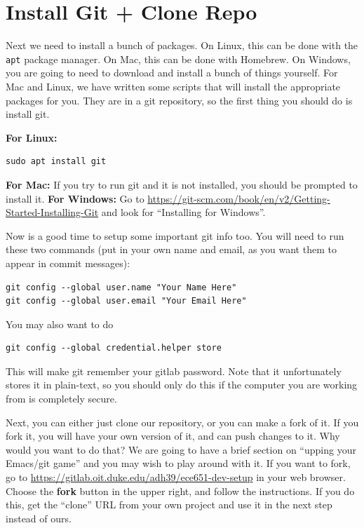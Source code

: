\documentclass[12pt]{article}
\begin{document}
\section{Install Git + Clone Repo}
\label{setup:git}
Next we need to install a bunch of packages.  On Linux, this can be done with
the \verb+apt+ package manager.  On Mac, this can be done with Homebrew.
On Windows, you are going to need to download and install a bunch of things yourself.
For Mac and Linux, we have written some scripts that will install the appropriate
packages for you.  They are in a git repository, so the first thing you should
do is install git.

\textbf{For Linux:}
\begin{verbatim}
sudo apt install git
\end{verbatim}
\textbf{For Mac:}
If you try to run git and it is not installed, you should be prompted to install it.
\textbf{For Windows:}
Go to \url{https://git-scm.com/book/en/v2/Getting-Started-Installing-Git} and look for ``Installing for Windows''.


Now is a good time to setup some important git info too.  You will
need to run these two commands (put in your own name and email, as you
want them to appear in commit messages):

\begin{verbatim}
git config --global user.name "Your Name Here" 
git config --global user.email "Your Email Here"
\end{verbatim}

You may also want to do

\begin{verbatim}
git config --global credential.helper store
\end{verbatim}

This will make git remember your gitlab password.  Note that it
unfortunately stores it in plain-text, so you should only do this if
the computer you are working from is completely secure.

Next, you can either just clone our repository, or you can make a fork
of it.  If you fork it, you will have your own version of it, and can
push changes to it.  Why would you want to do that?  We are going to
have a brief section on ``upping your Emacs/git game'' and you may
wish to play around with it.  If you want to fork, go to
\url{https://gitlab.oit.duke.edu/adh39/ece651-dev-setup} in your web
browser.  Choose the \textbf{fork} button in the upper right, and
follow the instructions.  If you do this, get the ``clone'' URL from
your own project and use it in the next step instead of ours.
\end{document}
